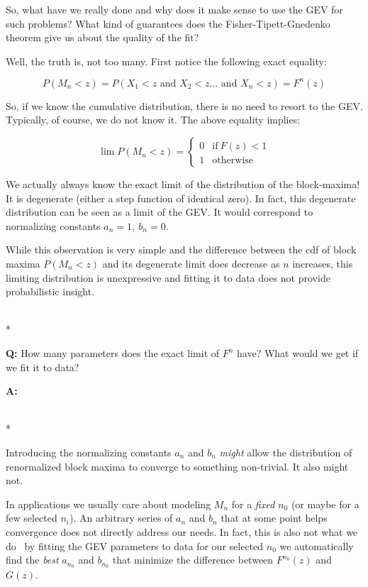 So, what have we really done and why does it make sense to use the GEV for such
problems? What kind of guarantees does the Fisher-Tipett-Gnedenko theorem give
us about the quality of the fit?


Well, the truth is, not too many. First notice the following exact equality:


\begin{equation}
    P(M_n < z) = P(X_1< z \text{ and } X_2 < z ... \text{ and  } X_n < z) = F^n(z)
\end{equation}


So, if we know the cumulative distribution, there is no need to resort to the
GEV. Typically, of course, we do not know it. The above equality implies:


\begin{equation}
    \lim P(M_n < z) =     
        \begin{cases}
          0 & \text{if}\ F(z) < 1 \\
          1 & \text{otherwise}
        \end{cases}
\end{equation}


We actually always know the exact limit of the distribution of the block-maxima!
It is degenerate (either a step function of identical zero). In fact, this
degenerate distribution can be seen as a limit of the GEV. It would correspond
to normalizing constants $a_n=1, \ b_n=0$.

While this observation is very simple and the difference between the cdf of
block maxima $P(M_n < z)$ and its degenerate limit does decrease as $n$
increases, this limiting distribution is unexpressive and fitting it to data
does not provide probabilistic insight.

\hrulefill\\*

\textbf{Q:} How many parameters does the exact limit of $F^n$ have? What would we get if we fit it to data?

\textbf{A:}

\hrulefill\\*

Introducing the normalizing constants $a_n$ and $b_n$ \textit{might} allow the
distribution of renormalized block maxima to converge to something non-trivial.
It also might not.

In applications we usually care about modeling $M_n$ for a \textit{fixed $n_0$} (or
maybe for a few selected $n_i$). An arbitrary series of $a_n$ and $b_n$ that at
some point helps convergence does not directly address our needs. In fact, this
is also not what we do \textemdash\ by fitting the GEV parameters to data for our selected
$n_0$ we automatically find the \textit{best} $a_{n_0}$ and $b_{n_0}$ that minimize the
difference between $F^{n_0}(z)$ and $G(z)$.


